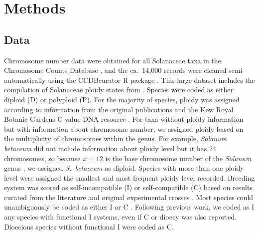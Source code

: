 \section{Methods}

\subsection{Data}


Chromosome number data were obtained for all Solanaceae taxa in the Chromosome Counts Database \citep[CCDB;][]{rice_2015}, and the ca.~14,000 records were cleaned semi-automatically using the CCDBcurator R package \citep{rivero_2019}. %
This large dataset includes the compilation of Solanaceae ploidy states from \citet{robertson_2011}.
Species were coded as either diploid (D) or polyploid (P).
For the majority of species, ploidy was assigned according to information from the original publications and the Kew Royal Botanic Gardens C-value DNA resource \citep{bennett_2005}.
For taxa without ploidy information but with information about chromosome number, we assigned ploidy based on the multiplicity of chromosomes within the genus.
For example, \textit{Solanum betaceum} did not include information about ploidy level but it has 24 chromosomes, so because $x=12$ is the base chromosome number of the \textit{Solanum} genus \citep{olmstead_2007}, we assigned \textit{S.~betaceum} as diploid. 
Species with more than one ploidy level were assigned the smallest and most frequent ploidy level recorded.
%
Breeding system was scored as self-incompatible (I) or self-compatible (C) based on results curated from the literature and  original experimental crosses \citep[as compiled in][]{igic_2006, goldberg_2010, robertson_2011, goldberg_2012}.
Most species could unambiguously be coded as either I or C \citep{raduski_2012}.
Following previous work, we coded as I any species with functional I systems, even if C or dioecy was also reported.
Dioecious species without functional I were coded as C.

%

